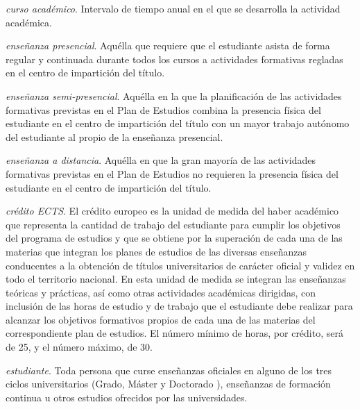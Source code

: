     \item \emph{curso académico}. Intervalo de tiempo anual en el que se desarrolla la actividad académica. 

    \item \emph{enseñanza presencial}. Aquélla que requiere que el estudiante
        asista de forma regular y continuada durante todos los cursos a
        actividades formativas regladas en el centro de impartición del título\cite[página 10]{guiaMadridMasD}.

    \item \emph{enseñanza semi-presencial}. Aquélla en la que la planificación de las
        actividades formativas previstas en el Plan de Estudios combina la
        presencia física del estudiante en el centro de impartición del título con un
        mayor trabajo autónomo del estudiante al propio de la enseñanza
        presencial\cite[página 10]{guiaMadridMasD}.

    \item \emph{enseñanza a distancia}. Aquélla en que la gran mayoría de las actividades
        formativas previstas en el Plan de Estudios no requieren la presencia física
        del estudiante en el centro de impartición del título\cite[página 10]{guiaMadridMasD}.

    \item \emph{crédito ECTS}. El crédito europeo es la unidad de medida del
        haber académico que representa la cantidad de trabajo del estudiante
        para cumplir los objetivos del programa de estudios y que se obtiene
        por la superación de cada una de las materias que integran los planes
        de estudios de las diversas enseñanzas conducentes a la obtención de
        títulos universitarios de carácter oficial y validez en todo el
        territorio nacional. En esta unidad de medida se integran las
        enseñanzas teóricas y prácticas, así como otras actividades académicas
        dirigidas, con inclusión de las horas de estudio y de trabajo que el
        estudiante debe realizar para alcanzar los objetivos formativos propios
        de cada una de las materias del correspondiente plan de
        estudios\cite[artículo 3]{rdECTS}. El número mínimo de horas, por
        crédito, será de 25, y el número máximo, de 30\cite[artículo 4, apartado 
        5]{rdECTS}.

    \item \emph{estudiante}. Toda  persona  que  curse  enseñanzas  oficiales
        en alguno de los tres ciclos universitarios (Grado, Máster y Doctorado
        \cite[artículo 8]{rd1393}), enseñanzas de formación continua u otros
        estudios ofrecidos por las universidades\cite[artículo
        1, apartado 3]{estatutoEstudiante}.

